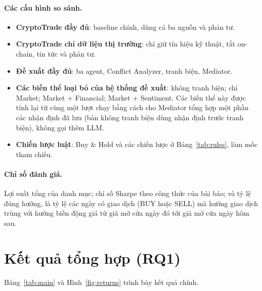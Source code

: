 \paragraph{Các cấu hình so sánh.}
\begin{itemize}
  \item \textbf{CryptoTrade đầy đủ}: baseline chính, dùng cả ba nguồn và phản tư.
  \item \textbf{CryptoTrade chỉ dữ liệu thị trường}: chỉ giữ tín hiệu kỹ thuật, tắt on-chain, tin tức và phản tư.
  \item \textbf{Đề xuất đầy đủ}: ba agent, Conflict Analyzer, tranh biện, Mediator.
  \item \textbf{Các biến thể loại bỏ của hệ thống đề xuất}: không tranh biện; chỉ Market; Market + Financial; Market +
  Sentiment. Các biến thể này được tính lại từ cùng một lượt chạy bằng cách cho Mediator tổng hợp một phần các nhận định
  đã lưu (bản không tranh biện dùng nhận định trước tranh biện), không gọi thêm LLM.
  \item \textbf{Chiến lược luật}: Buy \& Hold và các chiến lược ở Bảng~\ref{tab:rules}, làm mốc tham chiếu.
\end{itemize}

\paragraph{Chỉ số đánh giá.} Lợi suất tổng của danh mục; chỉ số Sharpe theo công thức của bài báo; và tỷ lệ đúng hướng,
là tỷ lệ các ngày có giao dịch (BUY hoặc SELL) mà hướng giao dịch trùng với hướng biến động giá từ giá mở cửa
ngày đó tới giá mở cửa ngày hôm sau.

\section{Kết quả tổng hợp (RQ1)}
Bảng~\ref{tab:main} và Hình~\ref{fig:returns} trình bày kết quả chính.


